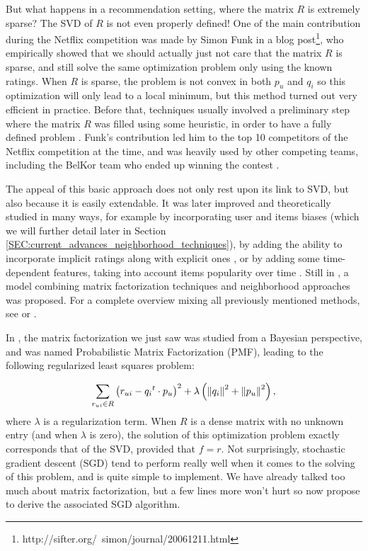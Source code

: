 But what happens in a recommendation setting, where the matrix $R$ is extremely
sparse? The SVD of $R$ is not even properly defined! One of the main
contribution during the Netflix competition was made by Simon Funk in a blog
post\footnote{http://sifter.org/~simon/journal/20061211.html}, who
empirically showed that we should actually just not care that the matrix $R$ is
sparse, and still solve the same optimization problem only using the known
ratings.  When $R$ is sparse, the problem is not convex in both $p_u$ and $q_i$
so this optimization will only lead to a local minimum,
but this method turned out very efficient in practice. Before that,
techniques usually involved  a preliminary step where the matrix $R$ was filled
using some heuristic, in order to have a fully defined problem
\cite{SarKarKonRie00}. Funk's
contribution led him to the top 10 competitors of the Netflix competition at
the time, and was heavily used by other competing teams, including the BelKor
team who ended up winning the contest \cite{Kor09}.

The appeal of this basic approach does not only rest upon its link to SVD, but
also because it is easily extendable. It was later improved and theoretically
studied in many ways, for example by incorporating user and items biases
\cite{KorACM2010} (which we will further detail later in Section
\ref{SEC:current_advances_neighborhood_techniques}), by adding the ability to
incorporate implicit ratings along with explicit ones \cite{Pat07, KorACM2010}, or by
adding some time-dependent features, taking into account items popularity over
time \cite{Kor09}. Still in \cite{KorACM2010}, a model combining matrix
factorization techniques and neighborhood approaches was proposed. For a
complete overview mixing all previously mentioned methods, see
\cite{KorBel11} or \cite{KorBelVol09}.

In \cite{SalMni07}, the matrix factorization we just saw was studied from a Bayesian
perspective, and was named Probabilistic Matrix Factorization (PMF), leading to
the following regularized least squares problem:

$$
\sum_{r_{ui} \in R} \left(r_{ui} - {q_i}^t \cdot p_u \right)^2 +
\lambda\left({\left\lVert q_i\right\rVert}_{}^2 + {\left\lVert p_u\right\rVert}_{}^2\right),
$$
where $\lambda$ is a regularization term. When
$R$ is a dense matrix with no unknown entry (and when $\lambda$ is zero), the
solution of this optimization problem exactly corresponds that of the SVD,
provided that $f=r$. Not
surprisingly, stochastic gradient descent (SGD) tend to perform really well
when it comes to the solving of this problem, and is quite simple to implement.
We have already talked too much about matrix factorization, but a few lines
more won't hurt so now propose to derive the associated SGD algorithm.


